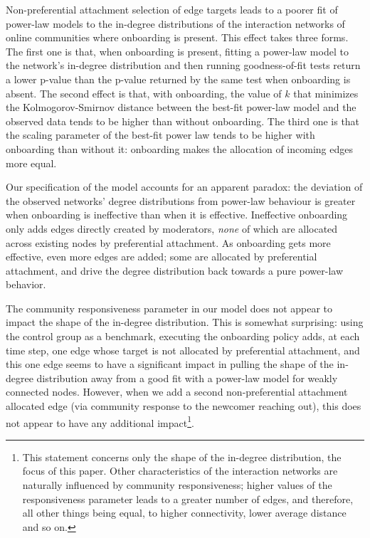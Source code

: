 Non-preferential attachment selection of edge targets leads to a poorer fit of power-law models to the in-degree distributions of the interaction networks of online communities where onboarding is present. This effect takes three forms. The first one is that, when onboarding is present, fitting a power-law model to the network's in-degree distribution and then running goodness-of-fit tests return a lower p-value than the p-value returned by the same test when onboarding is absent. The second effect is that, with onboarding, the value of $k$ that minimizes the Kolmogorov-Smirnov distance between the best-fit power-law model and the observed data tends to be higher than without onboarding. The third one is that the scaling parameter of the best-fit power law tends to be higher with onboarding than without it: onboarding makes the allocation of incoming edges more equal. 

Our specification of the model accounts for an apparent paradox: the deviation of the observed networks' degree distributions from power-law behaviour is greater when onboarding is ineffective than when it is effective. Ineffective onboarding only adds edges directly created by moderators, \emph{none} of which are allocated across existing nodes by preferential attachment. As onboarding gets more effective, even more edges are added; some are allocated by preferential attachment, and drive the degree distribution back towards a pure power-law behavior. 

The community responsiveness parameter in our model does not appear to impact the shape of the in-degree distribution. This is somewhat surprising: using the control group as a benchmark, executing the onboarding policy adds, at each time step, one edge whose target is not allocated by preferential attachment, and this one edge seems to have a significant impact in pulling the shape of the in-degree distribution away from a good fit with a power-law model for weakly connected nodes. However, when we add a second non-preferential attachment allocated edge (via community response to the newcomer reaching out), this does not appear to have any additional impact\footnote{This statement concerns only the shape of the in-degree distribution, the focus of this paper. Other characteristics of the interaction networks are naturally influenced by community responsiveness; higher values of the responsiveness parameter leads to a greater number of edges, and therefore, all other things being equal, to higher connectivity, lower average distance and so on. }.

